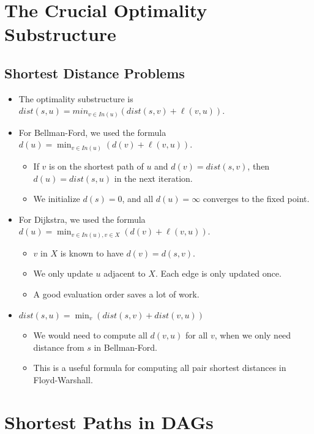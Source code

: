 
\section{The Crucial Optimality Substructure}

\subsection{Shortest Distance Problems}
\begin{itemize}
    \item The optimality substructure is $dist(s, u) = min_{v \in In(u)}(dist(s, v) + \ell(v, u))$.
    \item For Bellman-Ford, we used the formula $d(u) = \min_{v \in In(u)}(d(v) + \ell(v, u))$.
    \begin{itemize}
        \item If $v$ is on the shortest path of $u$ and $d(v) = dist(s, v)$, then $d(u) = dist(s, u)$ in the next iteration.
        \item We initialize $d(s) = 0$, and all $d(u) = \infty$ converges to the fixed point.
    \end{itemize}
    \item For Dijkstra, we used the formula $d(u) = \min_{v \in In(u), v \in X}(d(v) + \ell(v, u))$.
    \begin{itemize}
        \item $v$ in $X$ is known to have $d(v) = d(s, v)$.
        \item We only update $u$ adjacent to $X$. Each edge is only updated once.
        \item A good evaluation order saves a lot of work.
    \end{itemize}
    \item $dist(s, u) = \min_v(dist(s, v) + dist(v, u))$
    \begin{itemize}
        \item We would need to compute all $d(v, u)$ for all $v$, when we only need distance from $s$ in Bellman-Ford.
        \item This is a useful formula for computing all pair shortest distances in Floyd-Warshall.
    \end{itemize}
\end{itemize}

\section{Shortest Paths in DAGs}

